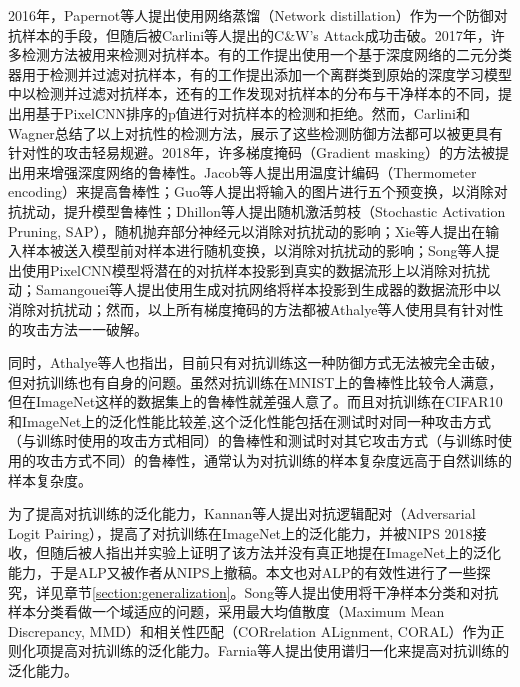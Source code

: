2016年，Papernot等人提出使用网络蒸馏（Network distillation）作为一个防御对抗样本的手段\cite{papernot2016distillation}，但随后被Carlini等人提出的C\&W's Attack成功击破。2017年，许多检测方法被用来检测对抗样本。有的工作提出使用一个基于深度网络的二元分类器用于检测并过滤对抗样本\cite{lu2017safetynet, metzen2017detecting, gong2017adversarial}，有的工作提出添加一个离群类到原始的深度学习模型中以检测并过滤对抗样本\cite{grosse2017statistical}，还有的工作发现对抗样本的分布与干净样本的不同，提出用基于PixelCNN\cite{Salimans2017pixelcnn}排序的p值进行对抗样本的检测和拒绝\cite{song2017pixeldefend}。然而，Carlini和Wagner总结了以上对抗性的检测方法，展示了这些检测防御方法都可以被更具有针对性的攻击轻易规避\cite{carlini2017adversarial, carlini2017magnet}。2018年，许多梯度掩码（Gradient masking）的方法被提出用来增强深度网络的鲁棒性。Jacob等人提出用温度计编码（Thermometer encoding）来提高鲁棒性\cite{buckman2018thermometer}；Guo等人提出将输入的图片进行五个预变换，以消除对抗扰动，提升模型鲁棒性\cite{guo2018countering}；Dhillon等人提出随机激活剪枝（Stochastic Activation Pruning, SAP），随机抛弃部分神经元以消除对抗扰动的影响\cite{s.2018stochastic}；Xie等人提出在输入样本被送入模型前对样本进行随机变换，以消除对抗扰动的影响\cite{xie2018mitigating}；Song等人提出使用PixelCNN模型将潜在的对抗样本投影到真实的数据流形上以消除对抗扰动\cite{song2018pixeldefend}；Samangouei等人提出使用生成对抗网络将样本投影到生成器的数据流形中以消除对抗扰动\cite{samangouei2018defensegan}；然而，以上所有梯度掩码的方法都被Athalye等人使用具有针对性的攻击方法一一破解\cite{pmlr-v80-athalye18a}。

同时，Athalye等人也指出，目前只有对抗训练这一种防御方式无法被完全击破，但对抗训练也有自身的问题\cite{pmlr-v80-athalye18a}。虽然对抗训练在MNIST上的鲁棒性比较令人满意\cite{madry2018towards}，但在ImageNet这样的数据集上的鲁棒性就差强人意了\cite{kurakin2017adversarial}。而且对抗训练在CIFAR10和ImageNet上的泛化性能比较差,这个泛化性能包括在测试时对同一种攻击方式（与训练时使用的攻击方式相同）的鲁棒性和测试时对其它攻击方式（与训练时使用的攻击方式不同）的鲁棒性，通常认为对抗训练的样本复杂度远高于自然训练的样本复杂度\cite{schmidt2018adversarially}。

为了提高对抗训练的泛化能力，Kannan等人提出对抗逻辑配对（Adversarial Logit Pairing），提高了对抗训练在ImageNet上的泛化能力\cite{kannan2018adversarial}，并被NIPS 2018接收，但随后被人指出并实验上证明了该方法并没有真正地提在ImageNet上的泛化能力\cite{engstrom2018evaluating}，于是ALP又被作者从NIPS上撤稿。本文也对ALP的有效性进行了一些探究，详见章节\ref{section:generalization}。Song等人提出使用将干净样本分类和对抗样本分类看做一个域适应的问题，采用最大均值散度（Maximum Mean Discrepancy, MMD）和相关性匹配（CORrelation ALignment, CORAL）作为正则化项提高对抗训练的泛化能力\cite{song2018improving}。Farnia等人提出使用谱归一化来提高对抗训练的泛化能力\cite{farnia2018generalizable}。